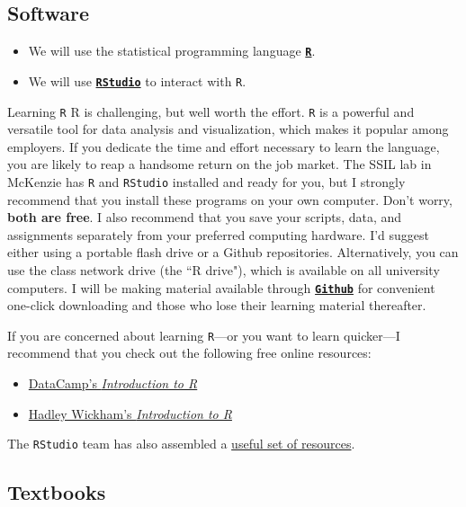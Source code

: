 \documentclass[10pt]{article}
\begin{document}
\subsection*{Software}

\begin{itemize}
	\item We will use the statistical programming language \href{https://www.r-project.org/}{\textbf{\texttt{R}}}.
	\item We will use \href{https://www.rstudio.com}{\textbf{\texttt{RStudio}}} to interact with \texttt{R}.
\end{itemize}
Learning \texttt{R} R is challenging, but well worth the effort. \texttt{R} is a powerful and versatile tool for data analysis and visualization, which makes it popular among employers. If you dedicate the time and effort necessary to learn the language, you are likely to reap a handsome return on the job market. The SSIL lab in McKenzie has \texttt{R} and \texttt{RStudio} installed and ready for you, but I strongly recommend that you install these programs on your own computer. Don't worry, \textbf{both are free}. I also recommend that you save your scripts, data, and assignments separately from your preferred computing hardware. I'd suggest either using a portable flash drive or a Github repositories. Alternatively, you can use the class network drive (the ``R drive"), which is available on all university computers. I will be making material available through \href{https://github.com/peconomi/EC320_Econometrics}{\textbf{\texttt{Github}}} for convenient one-click downloading and those who lose their learning material thereafter. 

If you are concerned about learning \texttt{R}---or you want to learn quicker---I recommend that you check out the following free online resources:
\begin{itemize}
	\item \href{https://www.datacamp.com/courses/free-introduction-to-r}{DataCamp's \textit{Introduction to R}}
	\item \href{https://r4ds.had.co.nz/introduction.html}{Hadley Wickham's \textit{Introduction to R}}
\end{itemize}
The \texttt{RStudio} team has also assembled a \href{https://www.rstudio.com/online-learning/}{useful set of resources}.

\subsection*{Textbooks}
\end{document}
